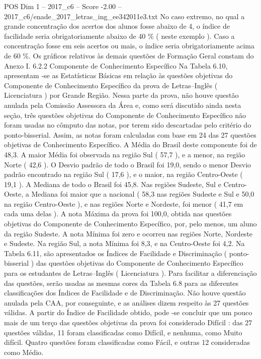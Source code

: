 \begin{textsample}{POS Dim 1 – 2017\_c6 – Score -2.00 – 2017\_c6/enade\_2017\_letras\_ing\_ee342011e3.txt}
No caso extremo, no qual a grande concentração dos acertos dos alunos fosse abaixo de 4, o índice de facilidade seria obrigatoriamente abaixo de 40 \% ( neste exemplo ).
Caso a concentração fosse em seis acertos ou mais, o índice seria obrigatoriamente acima de 60 \%.
Os gráficos relativos às demais questões de Formação Geral constam do Anexo I. 6.2.2 Componente de Conhecimento Específico Na Tabela 6.10, apresentam -se as Estatísticas Básicas em relação às questões objetivas do Componente de Conhecimento Específico da prova de Letras–Inglês ( Licenciatura ) por Grande Região.
Nessa parte da prova, não houve questão anulada pela Comissão Assessora da Área e, como será discutido ainda nesta seção, três questões objetivas do Componente de Conhecimento Específico não foram usadas no cômputo das notas, por terem sido descartadas pelo critério do ponto-bisserial.
Assim, as notas foram calculadas com base em 24 das 27 questões objetivas de Conhecimento Específico.
A Média do Brasil deste componente foi de 48,3.
A maior Média foi observada na região Sul ( 57,7 ), e a menor, na região Norte ( 42,6 ).
O Desvio padrão de todo o Brasil foi 19,0, sendo o menor Desvio padrão encontrado na região Sul ( 17,6 ), e o maior, na região Centro-Oeste ( 19,1 ).
A Mediana de todo o Brasil foi 45,8.
Nas regiões Sudeste, Sul e Centro-Oeste, a Mediana foi maior que a nacional ( 58,3 nas regiões Sudeste e Sul e 50,0 na região Centro-Oeste ), e nas regiões Norte e Nordeste, foi menor ( 41,7 em cada uma delas ).
A nota Máxima da prova foi 100,0, obtida nas questões objetivas do Componente de Conhecimento Específico, por, pelo menos, um aluno da região Sudeste.
A nota Mínima foi zero e ocorreu nas regiões Norte, Nordeste e Sudeste.
Na região Sul, a nota Mínima foi 8,3, e na Centro-Oeste foi 4,2.
Na Tabela 6.11, são apresentados os Índices de Facilidade e Discriminação ( ponto-bisserial ) das questões objetivas do Componente de Conhecimento Específico para os estudantes de Letras–Inglês ( Licenciatura ).
Para facilitar a diferenciação das questões, serão usadas as mesmas cores da Tabela 6.8 para as diferentes classificações dos Índices de Facilidade e de Discriminação.
Não houve questão anulada pela CAA, por conseguinte, e as análises dizem respeito às 27 questões válidas.
A partir do Índice de Facilidade obtido, pode -se concluir que um pouco mais de um terço das questões objetivas da prova foi considerado Difícil : das 27 questões válidas, 11 foram classificadas como Difícil, e nenhuma, como Muito difícil.
Quatro questões foram classificadas como Fácil, e outras 12 consideradas como Médio.

\end{textsample}
